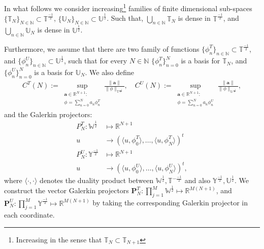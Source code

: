 \documentclass{article}
\newcommand{\ba} {\bm a}
\newcommand{\IN}{{\mathbb N}}
\newcommand{\IR}{{\mathbb R}}
\newcommand{\IU}{{\mathbb U}}
\newcommand{\IT}{{\mathbb T}}
\newcommand{\IW}{{\mathbb W}}
\newcommand{\IY}{{\mathbb Y}}
\begin{document}
In what follows we consider increasing\footnote{Increasing in the sense that $\IT_N \subset \IT_{N+1}$} families of finite dimensional sub-spaces $\{\IT_N\}_{N \in \IN} \subset \IT^{\frac{-1}{2}}$,  $\{\IU_N\}_{N \in \IN} \subset \IU^{\frac{1}{2}}$. Such that, $\bigcup_{n \in \IN} \IT_N $ is dense in $\IT^{\frac{-1}{2}}$, and  $\bigcup_{n \in \IN} \IU_N$ is dense in $\IU^\frac{1}{2}$. 

 Furthermore, we assume that there are two family of functions $\{\phi^T_n\}_{n\in \IN} \subset \IT^{\frac{-1}{2}}$, and $\{\phi^U_n\}_{n\in \IN} \subset \IU^{\frac{1}{2}}$, such that for every $N \in \IN$ $\{\phi^T_n\}_{n=0}^N$ is a basis for $\IT_N$, and $\{\phi^U_n\}_{n=0}^N$ is a basis for $\IU_N$. We also define 
 \begin{align*}
 C^T(N) := \sup_{ \substack{\ba \in \IR^{N+1}: \\
 			\phi = \sum_{n=0}^N a_n \phi_n^T}} \frac{\| \ba\|}{\|\phi\|_{\IT^{\frac{-1}{2}}}}, \quad 
 			 C^U(N) := \sup_{ \substack{\ba \in \IR^{N+1}: \\
 			\phi = \sum_{n=0}^N a_n \phi_n^U}} \frac{\| \ba\|}{\|\phi\|_{\IU^{\frac{-1}{2}}}},
 \end{align*}
and the Galerkin projectors: 
 \begin{align*}
 P_N^T : \IW^{\frac{1}{2}} &\mapsto \IR^{N+1}    \\
			u &\rightarrow  (\langle u , \phi^T_0\rangle , \hdots ,\langle u , \phi^T_N\rangle )^t \\
			P_N^U : \IY^{\frac{-1}{2}} &\mapsto \IR^{N+1}\\
			u &\rightarrow  (\langle u , \phi^U_0\rangle , \hdots ,\langle u , \phi^U_N\rangle )^t ,
 \end{align*}
 where $\langle \cdot, \cdot \rangle$ denotes the duality product between $\IW^{\frac{1}{2}},\IT^{-\frac{-1}{2}}$ and also $\IY^{\frac{-1}{2}},\IU^{\frac{1}{2}}$.  We construct the vector Galerkin projectors $\mathbf{P}_N^T : \prod_{j=1}^M\IW^{\frac{1}{2}} \mapsto \IR^{M(N+1)}$, and   $\mathbf{P}_N^U : \prod_{j=1}^M\IY^{\frac{-1}{2}} \mapsto \IR^{M(N+1)}$ by taking the corresponding Galerkin projector in each coordinate.
 
\end{document}
